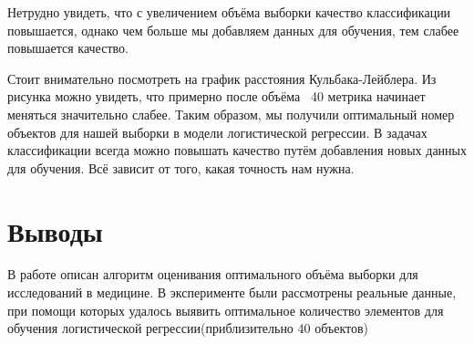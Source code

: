 \documentclass[12pt,twoside]{article}
\begin{document}
Нетрудно увидеть, что с увеличением объёма выборки качество классификации повышается, однако чем больше мы добавляем данных для обучения, тем слабее повышается качество.

\begin{figure}[h]
	\centering
	\label{fg:kl}
\end{figure}

Стоит внимательно посмотреть на график расстояния Кульбака-Лейблера. Из рисунка можно увидеть, что примерно после объёма ~40 метрика начинает меняться значительно слабее. Таким образом, мы получили оптимальный номер объектов для нашей выборки в модели логистической регрессии.
В задачах классификации всегда можно повышать качество путём добавления новых данных для обучения. Всё зависит от того, какая точность нам нужна. 

\section{Выводы}
В работе описан алгоритм оценивания оптимального объёма выборки для исследований в медицине. В эксперименте были рассмотрены реальные данные, при помощи которых удалось выявить оптимальное количество элементов для обучения логистической регрессии(приблизительно 40 объектов)



\end{document}
